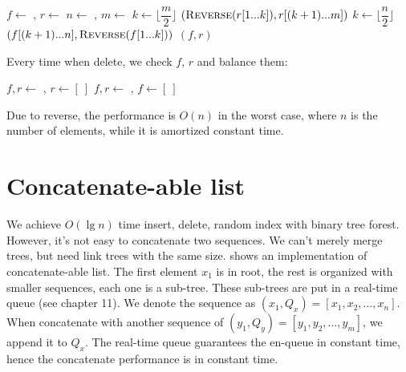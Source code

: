 \documentclass[b5paper]{article}
\begin{document}
\begin{algorithmic}[1]
  \State $f \gets$ , $r \gets$ 
  \State $n \gets$ , $m \gets$ 
    \State $k \gets \lfloor \dfrac{m}{2} \rfloor$
    \State \Return $(\textproc{Reverse}(r[1 ... k]), r[(k + 1) ... m])$
  \EndIf
    \State $k \gets \lfloor \dfrac{n}{2} \rfloor$
    \State \Return $(f[(k + 1) ... n], \textproc{Reverse}(f[1 ... k]))$
  \EndIf
  \State \Return $(f, r)$
\EndFunction
\end{algorithmic}

Every time when delete, we check $f$, $r$ and balance them:

\begin{algorithmic}[1]
  \State {}
  \State $f, r \gets$ , 
   
    \State $r \gets [\ ]$
  \Else
    \State {}
  \EndIf
\EndFunction
\Statex
{}
  \State {}
  \State $f, r \gets$ , 
   
    \State $f \gets [\ ]$
  \Else
    \State {}
  \EndIf
\EndFunction
\end{algorithmic}

Due to reverse, the performance is $O(n)$ in the worst case, where $n$ is the number of elements, while it is amortized constant time.

\begin{Exercise}
\end{Exercise}

\section{Concatenate-able list}

We achieve $O(\lg n)$ time insert, delete, random index with binary tree forest. However, it's not easy to concatenate two sequences. We can't merely merge trees, but need link trees with the same size.  shows an implementation of concatenate-able list. The first element $x_1$ is in root, the rest is organized with smaller sequences, each one is a sub-tree. These sub-trees are put in a real-time queue (see chapter 11). We denote the sequence as $(x_1, Q_x) = [x_1, x_2, ..., x_n]$. When concatenate with another sequence of $(y_1, Q_y) = [y_1, y_2, ..., y_m]$, we append it to $Q_x$. The real-time queue guarantees the en-queue in constant time, hence the concatenate performance is in constant time.
\end{document}
